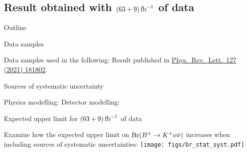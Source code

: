 \subsection{Result obtained with $(63+9)\mbox{\,fb}^{-1}$ of data}
\begin{frame}[noframenumbering]{Outline}
 \tableofcontents[currentsection, currentsubsection, subsubsectionstyle=hide]
\end{frame}
\begin{frame}{Data samples}
\bi
\item Data samples used in the following:
\bi
{} 
\ei
\itemi Result published in {\href{https://doi.org/10.1103/PhysRevLett.127.181802}{\color{blue!40!gray} Phys.~Rev.~Lett.~127 (2021) 181802}.}
\ei
\end{frame}
\begin{frame}{Sources of systematic uncertainty}
\bi
\item Physics modelling:
\bi
{}
\ei
\itemii Detector modelling:
\bi
{}
\ei
\ei
\end{frame}
\begin{frame}{Expected upper limit for $(63+9)\mbox{\,fb}^{-1}$ of data}
\bi
\item Examine how the expected upper limit on $\mathrm{Br}(B^+\rightarrow K^+\nu\bar{\nu})$ increases when including sources of systematic uncertainties:
\ei
\vspace{0.5cm}
\centering
\texttt{[image: figs/br\_stat\_syst.pdf]}
\end{frame}
